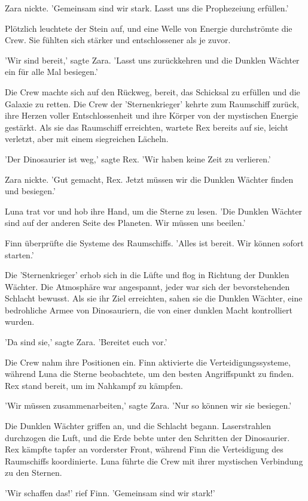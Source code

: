 \documentclass[12pt]{article}
\begin{document}
Zara nickte. 'Gemeinsam sind wir stark. Lasst uns die Prophezeiung erfüllen.'

Plötzlich leuchtete der Stein auf, und eine Welle von Energie durchströmte die Crew. Sie fühlten sich stärker und entschlossener als je zuvor.

'Wir sind bereit,' sagte Zara. 'Lasst uns zurückkehren und die Dunklen Wächter ein für alle Mal besiegen.'

Die Crew machte sich auf den Rückweg, bereit, das Schicksal zu erfüllen und die Galaxie zu retten. Die Crew der 'Sternenkrieger' kehrte zum Raumschiff zurück, ihre Herzen voller Entschlossenheit und ihre Körper von der mystischen Energie gestärkt. Als sie das Raumschiff erreichten, wartete Rex bereits auf sie, leicht verletzt, aber mit einem siegreichen Lächeln.

'Der Dinosaurier ist weg,' sagte Rex. 'Wir haben keine Zeit zu verlieren.'

Zara nickte. 'Gut gemacht, Rex. Jetzt müssen wir die Dunklen Wächter finden und besiegen.'

Luna trat vor und hob ihre Hand, um die Sterne zu lesen. 'Die Dunklen Wächter sind auf der anderen Seite des Planeten. Wir müssen uns beeilen.'

Finn überprüfte die Systeme des Raumschiffs. 'Alles ist bereit. Wir können sofort starten.'

Die 'Sternenkrieger' erhob sich in die Lüfte und flog in Richtung der Dunklen Wächter. Die Atmosphäre war angespannt, jeder war sich der bevorstehenden Schlacht bewusst. Als sie ihr Ziel erreichten, sahen sie die Dunklen Wächter, eine bedrohliche Armee von Dinosauriern, die von einer dunklen Macht kontrolliert wurden.

'Da sind sie,' sagte Zara. 'Bereitet euch vor.'

Die Crew nahm ihre Positionen ein. Finn aktivierte die Verteidigungssysteme, während Luna die Sterne beobachtete, um den besten Angriffspunkt zu finden. Rex stand bereit, um im Nahkampf zu kämpfen.

'Wir müssen zusammenarbeiten,' sagte Zara. 'Nur so können wir sie besiegen.'

Die Dunklen Wächter griffen an, und die Schlacht begann. Laserstrahlen durchzogen die Luft, und die Erde bebte unter den Schritten der Dinosaurier. Rex kämpfte tapfer an vorderster Front, während Finn die Verteidigung des Raumschiffs koordinierte. Luna führte die Crew mit ihrer mystischen Verbindung zu den Sternen.

'Wir schaffen das!' rief Finn. 'Gemeinsam sind wir stark!'
\end{document}
